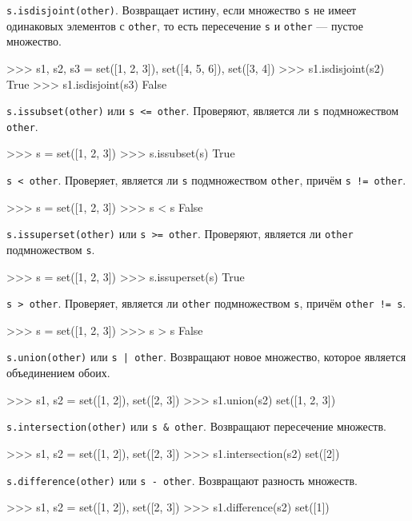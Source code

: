 \lstinline{s.isdisjoint(other)}. Возвращает истину, если множество \lstinline{s} не имеет одинаковых элементов с \lstinline{other}, то есть пересечение \lstinline{s} и \lstinline{other} — пустое множество.
\begin{pylst}{}{}
>>> s1, s2, s3 = set([1, 2, 3]), set([4, 5, 6]), set([3, 4])
>>> s1.isdisjoint(s2)
True
>>> s1.isdisjoint(s3)
False
\end{pylst}

\lstinline{s.issubset(other)} или \lstinline{s <= other}. Проверяют, является ли \lstinline{s} подмножеством \lstinline{other}.
\begin{pylst}{}{}
>>> s = set([1, 2, 3])
>>> s.issubset(s)
True
\end{pylst}

\lstinline{s < other}. Проверяет, является ли \lstinline{s} подмножеством \lstinline{other}, причём \lstinline{s != other}.
\begin{pylst}{}{}
>>> s = set([1, 2, 3])
>>> s < s
False
\end{pylst}

\lstinline{s.issuperset(other)} или \lstinline{s >= other}. Проверяют, является ли \lstinline{other} подмножеством \lstinline{s}.
\begin{pylst}{}{}
>>> s = set([1, 2, 3])
>>> s.issuperset(s)
True
\end{pylst}

\lstinline{s > other}. Проверяет, является ли \lstinline{other} подмножеством \lstinline{s}, причём \lstinline{other != s}.
\begin{pylst}{}{}
>>> s = set([1, 2, 3])
>>> s > s
False
\end{pylst}

\lstinline{s.union(other)} или \lstinline{s | other}. Возвращают новое множество, которое является объединением обоих.
\begin{pylst}{}{}
>>> s1, s2 = set([1, 2]), set([2, 3])
>>> s1.union(s2)
set([1, 2, 3])
\end{pylst}

\lstinline{s.intersection(other)} или \lstinline{s & other}. Возвращают пересечение множеств.
\begin{pylst}{}{}
>>> s1, s2 = set([1, 2]), set([2, 3])
>>> s1.intersection(s2)
set([2])
\end{pylst}

\lstinline{s.difference(other)} или \lstinline{s - other}. Возвращают разность множеств.
\begin{pylst}{}{}
>>> s1, s2 = set([1, 2]), set([2, 3])
>>> s1.difference(s2)
set([1])
\end{pylst}

